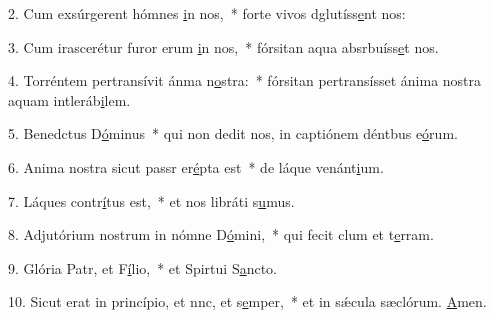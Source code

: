 2. Cum exsúrgerent hómnes \uline{i}n nos,~* forte vivos dglutíss\uline{e}nt nos:\par 
3. Cum irascerétur furor erum \uline{i}n nos,~* fórsitan aqua absrbuíss\uline{e}t nos.\par 
4. Torréntem pertransívit ánma n\uline{o}stra:~* fórsitan pertransísset ánima nostra aquam intleráb\uline{i}lem.\par 
5. Benedctus D\uline{ó}minus~* qui non dedit nos, in captiónem déntbus e\uline{ó}rum.\par 
6. Anima nostra sicut passr er\uline{é}pta est~* de láque venánt\uline{i}um.\par 
7. Láques contr\uline{í}tus est,~* et nos libráti s\uline{u}mus.\par 
8. Adjutórium nostrum in nómne D\uline{ó}mini,~* qui fecit clum et t\uline{e}rram.\par 
9. Glória Patr, et F\uline{í}lio,~* et Spirtui S\uline{a}ncto.\par 
10. Sicut erat in princípio, et nnc, et s\uline{e}mper,~* et in sǽcula sæclórum. \uline{A}men.\par 
